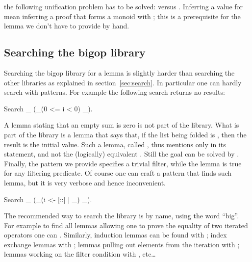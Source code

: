 the following unification problem has to be solved:
 versus .
Inferring a value for  mean
inferring a proof that  forms a monoid with ; this is a
prerequisite for the  lemma we don't have to provide
by hand.



\subsection{Searching the bigop library}

Searching the bigop library for a lemma is slightly harder than
searching the other libraries as explained in section~\ref{sec:search}.
In particular one can hardly search with patterns.  For example
the following search returns no results:

\begin{coq}{}{}
Search _ (\sum_(0 <= i < 0) _).
\end{coq}
A lemma stating that an empty sum is zero is not part of the library.
What is part of the library is a lemma that says that, if the list
being folded is , then the result is the initial value.  Such
a lemma, called , thus mentions only \C{[::]} in its
statement, and not the (logically) equivalent .
Still the goal  can be solved by
.  Finally, the pattern we provide specifies a trivial
filter, while the lemma is true for any filtering predicate.
Of course one can craft a pattern that finds such lemma, but it is very
verbose and hence inconvenient.

\begin{coq}{}{}
Search _ (\big[_/_]_(i <- [::] | _) _).
\end{coq}

The recommended way to search the library is by name, using the word
``big''.  For example to find all lemmas allowing one to prove the
equality of two iterated operators one can .
Similarly, induction lemmas can be found with ;  index exchange lemmas with ;
lemmas pulling out elements from the iteration
with ; lemmas  working on the filter condition
with , etc\ldots


